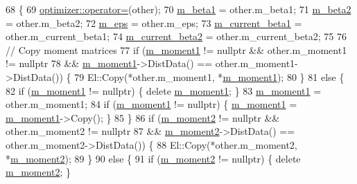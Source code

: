 \begin{DoxyCode}
68                                        \{
69   \hyperlink{classlbann_1_1optimizer_ab7811e0a4d2d9b594140aed78b6de743}{optimizer::operator=}(other);
70   \hyperlink{classlbann_1_1adam_a73af15a28066edbfad9ba6a900746a19}{m\_beta1} = other.m\_beta1;
71   \hyperlink{classlbann_1_1adam_ab1f2a16b8eb7e265895ea9eef3fe87b2}{m\_beta2} = other.m\_beta2;
72   \hyperlink{classlbann_1_1adam_a751102f0fd866612f5685050a08020a9}{m\_eps} = other.m\_eps;
73   \hyperlink{classlbann_1_1adam_a53c3034e187da2720447bbb4f2b59a5d}{m\_current\_beta1} = other.m\_current\_beta1;
74   \hyperlink{classlbann_1_1adam_ad38376b684d69d4a15da1d11f8808ca7}{m\_current\_beta2} = other.m\_current\_beta2;
75 
76   \textcolor{comment}{// Copy moment matrices}
77   \textcolor{keywordflow}{if} (\hyperlink{classlbann_1_1adam_aa10a518a5356257bc69e655b88b0ed67}{m\_moment1} != \textcolor{keyword}{nullptr} && other.m\_moment1 != \textcolor{keyword}{nullptr}
78       && \hyperlink{classlbann_1_1adam_aa10a518a5356257bc69e655b88b0ed67}{m\_moment1}->DistData() == other.m\_moment1->DistData()) \{
79     El::Copy(*other.m\_moment1, *\hyperlink{classlbann_1_1adam_aa10a518a5356257bc69e655b88b0ed67}{m\_moment1});
80   \}
81   \textcolor{keywordflow}{else} \{
82     \textcolor{keywordflow}{if} (\hyperlink{classlbann_1_1adam_aa10a518a5356257bc69e655b88b0ed67}{m\_moment1} != \textcolor{keyword}{nullptr}) \{ \textcolor{keyword}{delete} \hyperlink{classlbann_1_1adam_aa10a518a5356257bc69e655b88b0ed67}{m\_moment1}; \}
83     \hyperlink{classlbann_1_1adam_aa10a518a5356257bc69e655b88b0ed67}{m\_moment1} = other.m\_moment1;
84     \textcolor{keywordflow}{if} (\hyperlink{classlbann_1_1adam_aa10a518a5356257bc69e655b88b0ed67}{m\_moment1} != \textcolor{keyword}{nullptr}) \{ \hyperlink{classlbann_1_1adam_aa10a518a5356257bc69e655b88b0ed67}{m\_moment1} = \hyperlink{classlbann_1_1adam_aa10a518a5356257bc69e655b88b0ed67}{m\_moment1}->Copy(); \}
85   \}
86   \textcolor{keywordflow}{if} (\hyperlink{classlbann_1_1adam_aea3295a0ee7da5e9c56fd6ff2f05c63f}{m\_moment2} != \textcolor{keyword}{nullptr} && other.m\_moment2 != \textcolor{keyword}{nullptr}
87       && \hyperlink{classlbann_1_1adam_aea3295a0ee7da5e9c56fd6ff2f05c63f}{m\_moment2}->DistData() == other.m\_moment2->DistData()) \{
88     El::Copy(*other.m\_moment2, *\hyperlink{classlbann_1_1adam_aea3295a0ee7da5e9c56fd6ff2f05c63f}{m\_moment2});
89   \}
90   \textcolor{keywordflow}{else} \{
91     \textcolor{keywordflow}{if} (\hyperlink{classlbann_1_1adam_aea3295a0ee7da5e9c56fd6ff2f05c63f}{m\_moment2} != \textcolor{keyword}{nullptr}) \{ \textcolor{keyword}{delete} \hyperlink{classlbann_1_1adam_aea3295a0ee7da5e9c56fd6ff2f05c63f}{m\_moment2}; \}

\end{DoxyCode}
